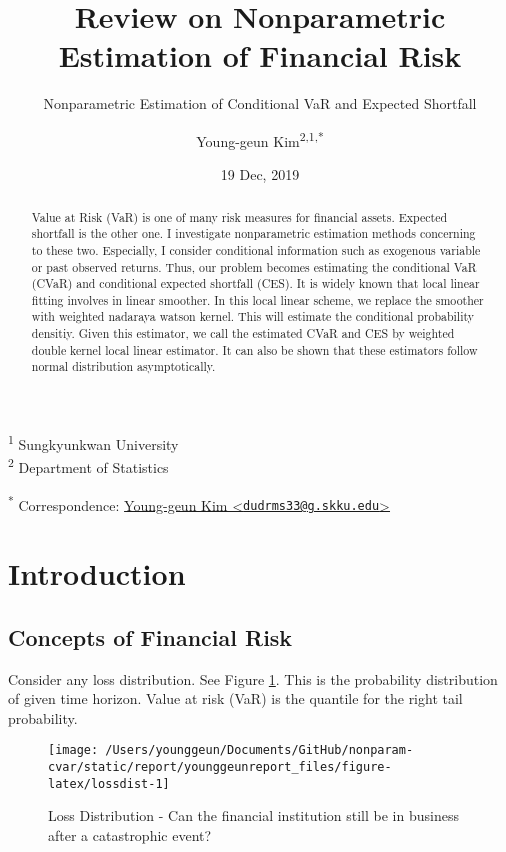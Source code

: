 \documentclass[
]{article}
\title{Review on Nonparametric Estimation of Financial Risk}
\subtitle{Nonparametric Estimation of Conditional VaR and Expected Shortfall}
\author{Young-geun Kim\textsuperscript{2,1,*}}
\date{19 Dec, 2019}
\theoremstyle{definition}
\theoremstyle{definition}
\theoremstyle{definition}
\theoremstyle{remark}
\begin{document}
\maketitle
\begin{abstract}
Value at Risk (VaR) is one of many risk measures for financial assets. Expected shortfall is the other one. I investigate nonparametric estimation methods concerning to these two. Especially, I consider conditional information such as exogenous variable or past observed returns. Thus, our problem becomes estimating the conditional VaR (CVaR) and conditional expected shortfall (CES). It is widely known that local linear fitting involves in linear smoother. In this local linear scheme, we replace the smoother with weighted nadaraya watson kernel. This will estimate the conditional probability densitiy. Given this estimator, we call the estimated CVaR and CES by weighted double kernel local linear estimator. It can also be shown that these estimators follow normal distribution asymptotically.
\end{abstract}

\textsuperscript{1} Sungkyunkwan University\\
\textsuperscript{2} Department of Statistics

\textsuperscript{*} Correspondence: \href{mailto:dudrms33@g.skku.edu}{Young-geun Kim \textless{}\href{mailto:dudrms33@g.skku.edu}{\nolinkurl{dudrms33@g.skku.edu}}\textgreater{}}

\hypertarget{introduction}{%
\section{Introduction}\label{introduction}}

\hypertarget{concepts-of-financial-risk}{%
\subsection{Concepts of Financial Risk}\label{concepts-of-financial-risk}}

Consider any loss distribution. See Figure \ref{fig:lossdist}. This is the probability distribution of given time horizon. Value at risk (VaR) is the quantile for the right tail probability.

\begin{figure}[H]

{\centering \texttt{[image: /Users/younggeun/Documents/GitHub/nonparam-cvar/static/report/younggeunreport\_files/figure-latex/lossdist-1]} 

}

\caption{Loss Distribution - Can the financial institution still be in business after a catastrophic event?}\label{fig:lossdist}
\end{figure}
\end{document}
